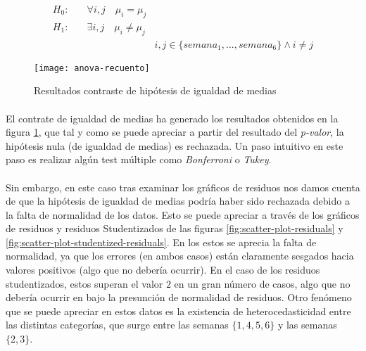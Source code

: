 \documentclass[11pt]{article}
\begin{document}
      \begin{align*}
        H_0:& \quad \forall i,j \quad \mu_{i} = \mu_{j} & \\
        H_1:& \quad \exists i,j \quad \mu_{i} \neq \mu_{j} & \\
        & & i,j \in \{semana_1,...,semana_6\} \land i \neq j
      \end{align*}

      \begin{figure}[!h]
        \centering
        \texttt{[image: anova-recuento]}
        \caption{Resultados contraste de hipótesis de igualdad de medias}
        \label{img:anova-recuento}
      \end{figure}

      \paragraph{}
      El contrate de igualdad de medias ha generado los resultados obtenidos en la figura \ref{img:anova-recuento}, que tal y como se puede apreciar a partir del resultado del \emph{p-valor}, la hipótesis nula (de igualdad de medias) es rechazada. Un paso intuitivo en este paso es realizar algún test múltiple como \emph{Bonferroni} o \emph{Tukey}.

      \paragraph{}
      Sin embargo, en este caso tras examinar los gráficos de residuos nos damos cuenta de que la hipótesis de igualdad de medias podría haber sido rechazada debido a la falta de normalidad de los datos. Esto se puede apreciar a través de los gráficos de residuos y residuos Studentizados de las figuras \ref{fig:scatter-plot-residuals} y \ref{fig:scatter-plot-studentized-residuals}. En los estos se aprecia la falta de normalidad, ya que los errores (en ambos casos) están claramente sesgados hacia valores positivos (algo que no debería ocurrir). En el caso de los residuos studentizados, estos superan el valor $2$ en un gran número de casos, algo que no debería ocurrir en bajo la presunción de normalidad de residuos. Otro fenómeno que se puede apreciar en estos datos es la existencia de heterocedasticidad entre las distintas categorías, que surge entre las semanas $\{ 1, 4, 5, 6\}$ y las semanas $\{ 2, 3\}$.
\end{document}
